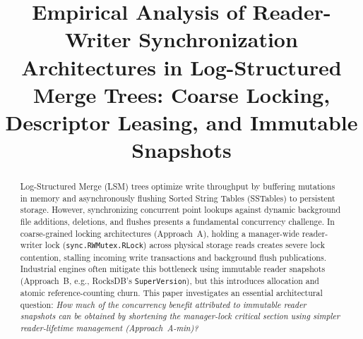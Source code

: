 \documentclass[conference]{IEEEtran}
\begin{document}
\title{Empirical Analysis of Reader-Writer Synchronization Architectures in Log-Structured Merge Trees: Coarse Locking, Descriptor Leasing, and Immutable Snapshots}

\author{
}

\maketitle

\begin{abstract}
Log-Structured Merge (LSM) trees optimize write throughput by buffering mutations in memory and asynchronously flushing Sorted String Tables (SSTables) to persistent storage. However, synchronizing concurrent point lookups against dynamic background file additions, deletions, and flushes presents a fundamental concurrency challenge. In coarse-grained locking architectures (Approach~A), holding a manager-wide reader-writer lock (\texttt{sync.RWMutex.RLock}) across physical storage reads creates severe lock contention, stalling incoming write transactions and background flush publications. Industrial engines often mitigate this bottleneck using immutable reader snapshots (Approach~B, e.g., RocksDB's \texttt{SuperVersion}), but this introduces allocation and atomic reference-counting churn. This paper investigates an essential architectural question: \emph{How much of the concurrency benefit attributed to immutable reader snapshots can be obtained by shortening the manager-lock critical section using simpler reader-lifetime management (Approach~A-min)?}


\end{abstract}
\end{document}
